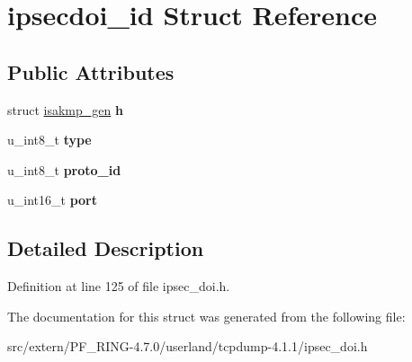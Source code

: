 \hypertarget{structipsecdoi__id}{
\section{ipsecdoi\_\-id Struct Reference}
\label{structipsecdoi__id}
}
\subsection*{Public Attributes}
\begin{DoxyCompactItemize}
\item 
\hypertarget{structipsecdoi__id_ac44100bffdd1620afdb49e630f5f0b8c}{
struct \hyperlink{structisakmp__gen}{isakmp\_\-gen} {\bfseries h}}
\label{structipsecdoi__id_ac44100bffdd1620afdb49e630f5f0b8c}

\item 
\hypertarget{structipsecdoi__id_af09f36b402498ef924e70a2953c01cf3}{
u\_\-int8\_\-t {\bfseries type}}
\label{structipsecdoi__id_af09f36b402498ef924e70a2953c01cf3}

\item 
\hypertarget{structipsecdoi__id_adeb88e98c781aee23f27f6c7c14a4812}{
u\_\-int8\_\-t {\bfseries proto\_\-id}}
\label{structipsecdoi__id_adeb88e98c781aee23f27f6c7c14a4812}

\item 
\hypertarget{structipsecdoi__id_a1b16a5b75b46843b7c779cf03f97e808}{
u\_\-int16\_\-t {\bfseries port}}
\label{structipsecdoi__id_a1b16a5b75b46843b7c779cf03f97e808}

\end{DoxyCompactItemize}


\subsection{Detailed Description}


Definition at line 125 of file ipsec\_\-doi.h.



The documentation for this struct was generated from the following file:\begin{DoxyCompactItemize}
\item 
src/extern/PF\_\-RING-\/4.7.0/userland/tcpdump-\/4.1.1/ipsec\_\-doi.h\end{DoxyCompactItemize}
